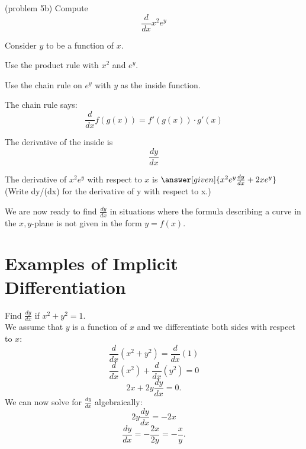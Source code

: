 \documentclass{ximera}
\begin{document}
\begin{problem}(problem 5b)
  Compute
  \[
  \frac{d}{dx} x^2e^y
  \]
  
	  
    \begin{hint}
      Consider $y$ to be a function of $x$.
    \end{hint}
		\begin{hint}
      Use the product rule with $x^2$ and $e^y$.
    \end{hint}
    \begin{hint}
      Use the chain rule on $e^y$ with $y$ as the inside function.
    \end{hint}
    \begin{hint}
      The chain rule says:
      \[
      \frac{d}{dx} f(g(x)) = f'(g(x))\cdot g'(x)
      \]
    \end{hint}
    \begin{hint}
      The derivative of the inside is 
      \[
      \frac{dy}{dx}
      \]
    \end{hint}
    
		The derivative of $x^2 e^y$ with respect to $x$ is
		 $\answer[given]{x^2 e^y \frac{dy}{dx} + 2xe^y}$  (Write dy/(dx) for the derivative of y with respect to x.)                 
		 
\end{problem}







We are now ready to find $\frac{dy}{dx}$ in situations where the formula describing a curve in the $x,y$-plane 
is not given in the form $y = f(x)$.

\section{Examples of Implicit Differentiation}


\begin{example}[example 6]
Find $\displaystyle{\frac{dy}{dx}}$ if $x^2 + y^2 = 1$.\\
We assume that $y$ is a 
function of $x$ and we differentiate both 
sides with respect to $x$:
\[\frac{d}{dx}(x^2 + y^2)  = \frac{d}{dx} (1) \]
\[\frac{d}{dx}(x^2) + \frac{d}{dx} (y^2) = 0\]
\[2x + 2y\frac{dy}{dx} = 0.\]
We can now solve for $\displaystyle{\frac{dy}{dx}}$ algebraically:
\[2y\frac{dy}{dx} = -2x\]
\[\frac{dy}{dx} = -\frac{2x}{2y}= -\frac{x}{y}.\]
\end{example}
\end{document}
